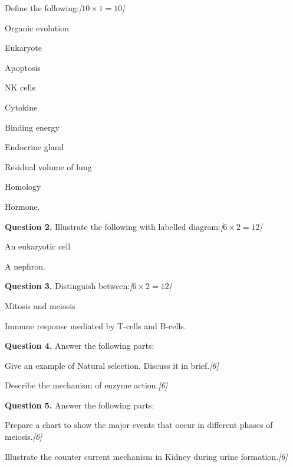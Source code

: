 \documentclass[11pt,a4paper]{article}
\newcommand{\pts}[1]{\hfill   \textit{[#1]}}
\begin{document}
\begin{parts}
  \item Define the following:\pts{$10  \times 1 = 10$}
  
\begin{parts}
    \item Organic evolution
    \item Eukaryote
    \item Apoptosis
    \item NK cells
    \item Cytokine
    \item Binding energy
    \item Endocrine gland
    \item Residual volume of lung
    \item Homology
    \item Hormone.
  \end{parts}
\end{parts}

\medskip


\noindent   \textbf{Question 2.} Illustrate the following with labelled diagram:\pts{$6  \times 2 = 12$}

\begin{parts}
  \item An eukaryotic cell
  \item A nephron.
\end{parts}

\medskip


\noindent   \textbf{Question 3.} Distinguish between:\pts{$6  \times 2 = 12$}

\begin{parts}
  \item Mitosis and meiosis
  \item Immune response mediated by T-cells and B-cells.
\end{parts}

\medskip


\noindent   \textbf{Question 4.} Answer the following parts:

\begin{parts}
  \item Give an example of Natural selection. Discuss it in brief.\pts{6}
  \item Describe the mechanism of enzyme action.\pts{6}
\end{parts}

\medskip


\noindent   \textbf{Question 5.} Answer the following parts:

\begin{parts}
  \item Prepare a chart to show the major events that occur in different phases of meiosis.\pts{6}
  \item Illustrate the counter current mechanism in Kidney during urine formation.\pts{6}
\end{parts}
\end{document}
